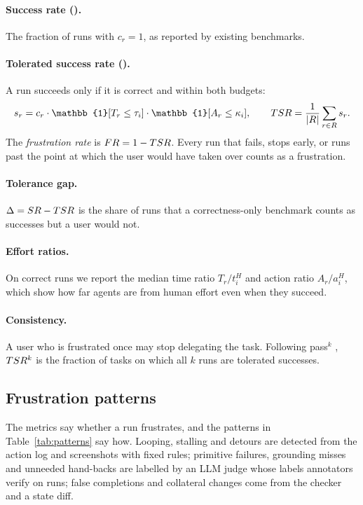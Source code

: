 \paragraph{Success rate (\sr).} The fraction of runs with $c_r = 1$, as reported by existing benchmarks.

\paragraph{Tolerated success rate (\tsr).} A run succeeds only if it is correct and within both budgets:
\begin{equation}
s_r = c_r \cdot \mathbb{1}[T_r \le \tau_i] \cdot \mathbb{1}[A_r \le \kappa_i], \qquad \tsr = \frac{1}{|R|}\sum_{r \in R} s_r .
\end{equation}
The \emph{frustration rate} is $FR = 1 - TSR$. Every run that fails, stops early, or runs past the point at which the user would have taken over counts as a frustration.

\paragraph{Tolerance gap.} $\Delta = SR - TSR$ is the share of runs that a correctness-only benchmark counts as successes but a user would not.

\paragraph{Effort ratios.} On correct runs we report the median time ratio $T_r / t^{H}_i$ and action ratio $A_r / a^{H}_i$, which show how far agents are from human effort even when they succeed.

\paragraph{Consistency.} A user who is frustrated once may stop delegating the task. Following pass$^k$ \citep{yao2025taubench}, $TSR^{k}$ is the fraction of tasks on which all $k$ runs are tolerated successes.

\subsection{Frustration patterns}
\label{sec:patterns}



The metrics say whether a run frustrates, and the patterns in Table~\ref{tab:patterns} say how. Looping, stalling and detours are detected from the action log and screenshots with fixed rules; primitive failures, grounding misses and unneeded hand-backs are labelled by an LLM judge whose labels annotators verify on  runs; false completions and collateral changes come from the checker and a state diff. 

